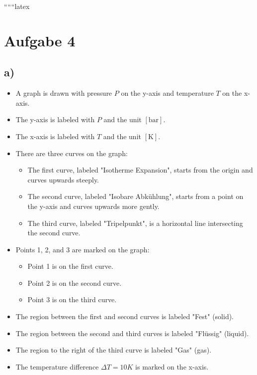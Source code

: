 
``````latex


\section*{Aufgabe 4}

\subsection*{a)}

\begin{itemize}
    \item A graph is drawn with pressure \( P \) on the y-axis and temperature \( T \) on the x-axis.
    \item The y-axis is labeled with \( P \) and the unit \([ \text{bar} ]\).
    \item The x-axis is labeled with \( T \) and the unit \([ \text{K} ]\).
    \item There are three curves on the graph:
    \begin{itemize}
        \item The first curve, labeled "Isotherme Expansion", starts from the origin and curves upwards steeply.
        \item The second curve, labeled "Isobare Abkühlung", starts from a point on the y-axis and curves upwards more gently.
        \item The third curve, labeled "Tripelpunkt", is a horizontal line intersecting the second curve.
    \end{itemize}
    \item Points 1, 2, and 3 are marked on the graph:
    \begin{itemize}
        \item Point 1 is on the first curve.
        \item Point 2 is on the second curve.
        \item Point 3 is on the third curve.
    \end{itemize}
    \item The region between the first and second curves is labeled "Fest" (solid).
    \item The region between the second and third curves is labeled "Flüssig" (liquid).
    \item The region to the right of the third curve is labeled "Gas" (gas).
    \item The temperature difference \(\Delta T = 10K\) is marked on the x-axis.
\end{itemize}

